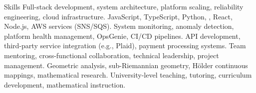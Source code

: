 
\begin{rubric}{Skills}
	Full-stack development, system architecture, platform scaling, reliability engineering, cloud infrastructure.
	JavaScript, TypeScript, Python, , React, Node.js, AWS services (SNS/SQS).
\entry*[DevOps]
	System monitoring, anomaly detection, platform health management, OpsGenie, CI/CD pipelines.
\entry*[Integration]
	API development, third-party service integration (e.g., Plaid), payment processing systems.
\entry*[Leadership]
	Team mentoring, cross-functional collaboration, technical leadership, project management.
\entry*[Mathematics]
	Geometric analysis, sub-Riemannian geometry, Hölder continuous mappings, mathematical research.
\entry*[Education]
	University-level teaching, tutoring, curriculum development, mathematical instruction.
\end{rubric}
